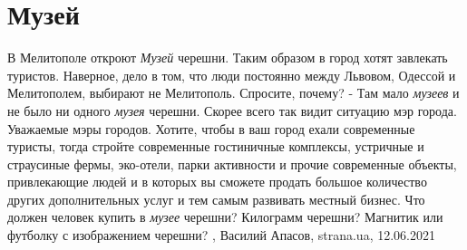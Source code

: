  
 
 
 
 
\chapter{Музей}

В Мелитополе откроют \emph{Музей} черешни.  Таким образом в город хотят
завлекать туристов.  Наверное, дело в том, что люди постоянно между Львовом,
Одессой и Мелитополем, выбирают не Мелитополь. Спросите, почему? - Там мало
\emph{музеев} и не было ни одного \emph{музея} черешни. Скорее всего так видит
ситуацию мэр города.  Уважаемые мэры городов. Хотите, чтобы в ваш город ехали
современные туристы, тогда стройте современные гостиничные комплексы, устричные
и страусиные фермы, эко-отели, парки активности и прочие современные объекты,
привлекающие людей и в которых вы сможете продать большое количество других
дополнительных услуг и тем самым развивать местный бизнес.  Что должен человек
купить в \emph{музее} черешни? Килограмм черешни? Магнитик или футболку с
изображением черешни?
, Василий Апасов, strana.ua, 12.06.2021 

